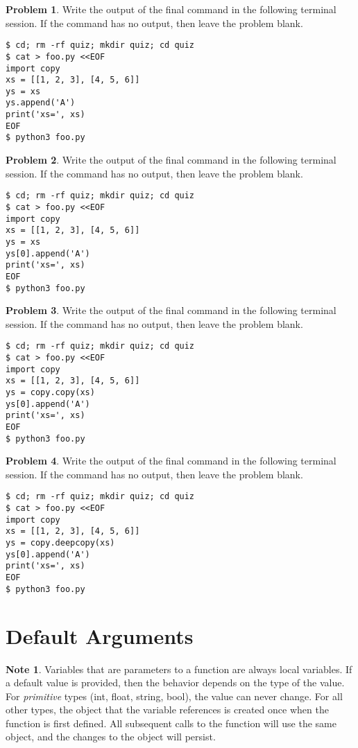 \documentclass[10pt]{article}
\theoremstyle{definition}
\newtheorem{problem}{Problem}
\newtheorem{note}{Note}
\begin{document}
\filbreak
\begin{problem}
    Write the output of the final command in the following terminal session.
    If the command has no output, then leave the problem blank.
\end{problem}
\begin{lstlisting}
$ cd; rm -rf quiz; mkdir quiz; cd quiz
$ cat > foo.py <<EOF
import copy
xs = [[1, 2, 3], [4, 5, 6]]
ys = xs
ys.append('A')
print('xs=', xs)
EOF
$ python3 foo.py
\end{lstlisting}


\filbreak
\begin{problem}
    Write the output of the final command in the following terminal session.
    If the command has no output, then leave the problem blank.
\end{problem}
\begin{lstlisting}
$ cd; rm -rf quiz; mkdir quiz; cd quiz
$ cat > foo.py <<EOF
import copy
xs = [[1, 2, 3], [4, 5, 6]]
ys = xs
ys[0].append('A')
print('xs=', xs)
EOF
$ python3 foo.py
\end{lstlisting}


\filbreak
\begin{problem}
    Write the output of the final command in the following terminal session.
    If the command has no output, then leave the problem blank.
\end{problem}
\begin{lstlisting}
$ cd; rm -rf quiz; mkdir quiz; cd quiz
$ cat > foo.py <<EOF
import copy
xs = [[1, 2, 3], [4, 5, 6]]
ys = copy.copy(xs)
ys[0].append('A')
print('xs=', xs)
EOF
$ python3 foo.py
\end{lstlisting}


\filbreak
\begin{problem}
    Write the output of the final command in the following terminal session.
    If the command has no output, then leave the problem blank.
\end{problem}
\begin{lstlisting}
$ cd; rm -rf quiz; mkdir quiz; cd quiz
$ cat > foo.py <<EOF
import copy
xs = [[1, 2, 3], [4, 5, 6]]
ys = copy.deepcopy(xs)
ys[0].append('A')
print('xs=', xs)
EOF
$ python3 foo.py
\end{lstlisting}

\section{Default Arguments}
\begin{note}
Variables that are parameters to a function are always local variables.
If a default value is provided, then the behavior depends on the type of the value.
For \emph{primitive} types (int, float, string, bool),
the value can never change.
For all other types, the object that the variable references is created once when the function is first defined.
All subsequent calls to the function will use the same object,
and the changes to the object will persist.
\end{note}
\end{document}

